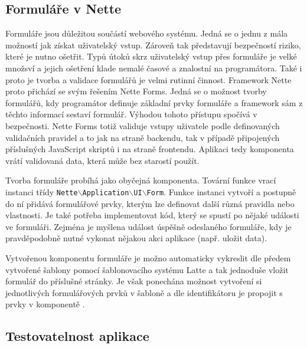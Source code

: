 \documentclass[czech,BP]{thesiskiv}
\begin{document}
		\subsection{Formuláře v Nette}
		\par Formuláře jsou důležitou součástí webového systému. Jedná se o jednu z mála možností jak získat uživatelský vstup. Zároveň tak představují bezpečností riziko, které je nutno ošetřit. Typů útoků skrz uživatelský vstup přes formuláře je velké množsví a jejich ošetření klade nemalé časové a znalostní na programátora. Také i proto je tvorba a validace formulářů je velmi rutinní činnost. Framework Nette proto přichází se svým řešením Nette Forms. Jedná se o možnost tvorby formulářů, kdy programátor definuje základní prvky formuláře a framework sám z těchto informací sestaví formulář. Výhodou tohoto přístupu spočívá v bezpečnosti. Nette Forms totiž validuje vstupy uživatele podle definovaných validačních pravidel a to jak na straně backendu, tak v případě připojených příslušných JavaScript skriptů i na straně frontendu. Aplikaci tedy komponenta vrátí validovaná data, která může bez starostí použít.
		\par Tvorba formuláře probíhá jako obyčejná komponenta. Tovární funkce vrací instanci třídy \texttt{Nette$\backslash$Application$\backslash$UI$\backslash$Form}. Funkce instanci vytvoří a postupně do ní přidává formulářové prvky, kterým lze definovat další různá pravidla nebo vlastnosti. Je také potřeba implementovat kód, který se spustí po nějaké události ve formuláři. Zejména je myšlena událost úspěšně odeslaného formuláře, kdy je pravděpodobně nutné vykonat nějakou akci aplikace (např. uložit data).
		\par Vytvořenou komponentu formuláře je možno automaticky vykreslit dle předem vytvořené šablony pomocí šablonovacího systému Latte a tak jednoduše vložit formulář do příslušné stránky. Je však ponechána možnost vytvoření si jednotlivých formulářových prvků v šabloně a dle identifikátoru je propojit s prvky v komponentě \cite{NetteDI}.
		
		\subsection{Testovatelnost aplikace}
\end{document}
